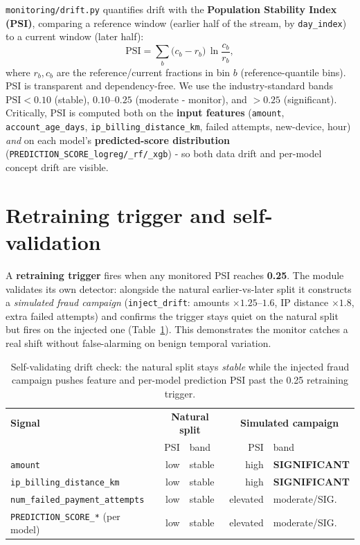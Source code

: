 \documentclass[11pt,a4paper]{report}
\newcommand{\code}[1]{\texttt{\small #1}}
\begin{document}
\code{monitoring/drift.py} quantifies drift with the \textbf{Population Stability Index
(PSI)}, comparing a reference window (earlier half of the stream, by \code{day\_index}) to a
current window (later half):
\begin{equation}
\text{PSI} = \sum_{b} \big(c_b - r_b\big)\,\ln\!\frac{c_b}{r_b},
\end{equation}
where $r_b, c_b$ are the reference/current fractions in bin $b$ (reference-quantile bins).
PSI is transparent and dependency-free. We use the industry-standard bands
$\text{PSI}<0.10$ (stable), $0.10$–$0.25$ (moderate - monitor), and $>0.25$ (significant).
Critically, PSI is computed both on the \textbf{input features} (\code{amount},
\code{account\_age\_days}, \code{ip\_billing\_distance\_km}, failed attempts, new-device,
hour) \emph{and} on each model's \textbf{predicted-score distribution}
(\code{PREDICTION\_SCORE\_logreg/\_rf/\_xgb}) - so both data drift and per-model concept
drift are visible.

\section{Retraining trigger and self-validation}

A \textbf{retraining trigger} fires when any monitored PSI reaches \textbf{0.25}. The module
validates its own detector: alongside the natural earlier-vs-later split it constructs a
\emph{simulated fraud campaign} (\code{inject\_drift}: amounts $\times1.25$–$1.6$, IP distance
$\times1.8$, extra failed attempts) and confirms the trigger stays quiet on the natural split
but fires on the injected one (Table~\ref{tab:drift}). This demonstrates the monitor catches
a real shift without false-alarming on benign temporal variation.

\begin{table}[h]
\centering
\small
\begin{tabular}{@{}l rl rl@{}}
\toprule
\textbf{Signal} & \multicolumn{2}{c}{\textbf{Natural split}} & \multicolumn{2}{c}{\textbf{Simulated campaign}}\\
 & PSI & band & PSI & band\\
\midrule
\code{amount} & low & stable & high & \textcolor{brandaccent}{\bfseries SIGNIFICANT}\\
\code{ip\_billing\_distance\_km} & low & stable & high & \textcolor{brandaccent}{\bfseries SIGNIFICANT}\\
\code{num\_failed\_payment\_attempts} & low & stable & elevated & moderate/SIG.\\
\code{PREDICTION\_SCORE\_*} (per model) & low & stable & elevated & moderate/SIG.\\
\bottomrule
\end{tabular}
\caption{Self-validating drift check: the natural split stays \emph{stable} while the injected
fraud campaign pushes feature and per-model prediction PSI past the 0.25 retraining trigger.}
\label{tab:drift}
\end{table}
\end{document}
